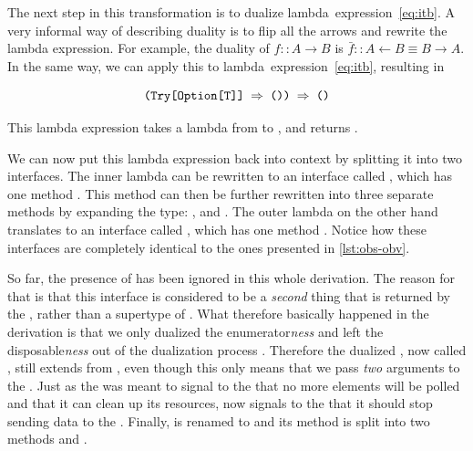 The next step in this transformation is to dualize \cite{rydeheard1988-Category-Theory} lambda~expression~\ref{eq:itb}. A very informal way of describing duality is to flip all the arrows and rewrite the lambda expression. For example, the duality of $f :: A \rightarrow B$ is $\bar{f} :: A \leftarrow B \equiv B \rightarrow A$. In the same way, we can apply this to lambda~expression~\ref{eq:itb}, resulting in

\begin{equation} \label{eq:obs}
\code{(Try[Option[T]] $\Rightarrow$ ()) $\Rightarrow$ ()}
\end{equation}

This lambda expression takes a lambda from  to , and returns .

We can now put this lambda expression back into context by splitting it into two interfaces. The inner lambda  can be rewritten to an interface called \obv, which has one method . This method can then be further rewritten into three separate methods by expanding the  type: ,  and . The outer lambda on the other hand translates to an interface called \obs, which has one method . Notice how these interfaces are completely identical to the ones presented in \autoref{lst:obs-obv}.


So far, the presence of \id has been ignored in this whole derivation. The reason for that is that this interface is considered to be a \emph{second} thing that is returned by the \ieb, rather than a supertype of \ier. What therefore basically happened in the derivation is that we only dualized the enumerator\textit{ness} and left the disposable\textit{ness} out of the dualization process \cite{E2E-Rx}. Therefore the dualized \ier, now called \obv, still extends from \id, even though this only means that we pass \textit{two} arguments to the . Just as the \id was meant to signal to the \ieb that no more elements will be polled and that it can clean up its resources, now \id signals to the \obs that it should stop sending data to the \obv. Finally, \id is renamed to \subs and its method  is split into two methods  and .

